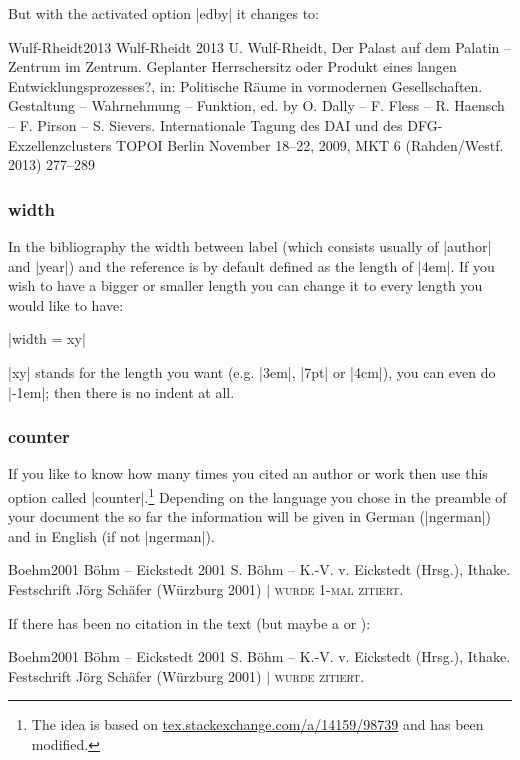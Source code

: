 \documentclass[a4paper,
10pt,
greek,
french,
spanish,
italian,
ngerman,
english
]{ltxdoc}
\begin{document}

 But with the activated option  |edby| it changes to:
 \begin{bibbsp}{Wulf-Rheidt2013}
Wulf-Rheidt 2013\hspace{3em} U. Wulf-Rheidt, Der Palast auf dem Palatin – Zentrum im Zentrum. Geplanter Herrschersitz oder Produkt eines langen Entwicklungsprozesses?, in:  {\color{red}Politische Räume in vormodernen Gesellschaften. Gestaltung – Wahrnehmung – Funktion, ed. by O. Dally – F. Fless – R. Haensch – F. Pirson – S. Sievers}. Internationale Tagung des DAI und des DFG-Exzellenzclusters TOPOI Berlin November 18–22, 2009, MKT 6 (Rahden/Westf. 2013) 277–289
 \end{bibbsp}
 
 
\subsubsection{width}\label{width}
In the bibliography the width between label (which consists usually of |author| and |year|) and the reference is  by default defined as the length of |4em|. 
If you wish to have a bigger or smaller length you can change it to every length you would like to have:

|width = xy|

|xy|  stands for the length you want  (e.g. |3em|, |7pt| or |4cm|), you can even do |-1em|; 
then there is no indent at all.

\subsubsection{counter}\label{counter}
 If you like to know how many times you cited an author or work then use this option called |counter|.\footnote{The idea is based on \href{http://tex.stackexchange.com/a/14159/98739}{tex.stackexchange.com/a/14159/98739} and has been modified.}
Depending on the language you chose in the preamble of your document the so far the information will be given in German (|ngerman|) and in English (if not |ngerman|).
\begin{bibbsp}{Boehm2001}
Böhm – Eickstedt 2001 \hspace{3em} S. Böhm – K.-V. v. Eickstedt (Hrsg.), Ithake. Festschrift Jörg Schäfer (Würzburg 2001)  $\vert$  {\scshape  wurde 1-mal zitiert.}
\end{bibbsp}
If there has been no citation in the text (but maybe a  or ):
\begin{bibbsp}{Boehm2001}
Böhm – Eickstedt 2001\hspace{3em} S. Böhm – K.-V. v. Eickstedt (Hrsg.), Ithake. Festschrift Jörg Schäfer (Würzburg 2001)  $\vert$  {\scshape  wurde {\color{red}{keinmal}} zitiert.}
\end{bibbsp} 
\end{document}
